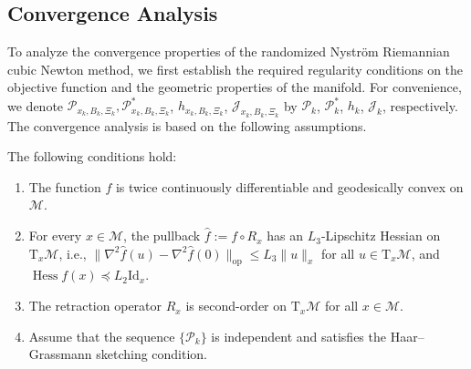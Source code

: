 \documentclass[final,onefignum,onetabnum]{siamart250211}
\newcommand{\Hess}{\operatorname{Hess}}
\newif\ifarxivversion
\begin{document}
  \ifarxivversion


\subsection{Convergence Analysis}
\label{sec:convergence-analysis}
To analyze the convergence properties of the randomized Nystr\"om Riemannian cubic Newton method, we first establish the required regularity conditions on the objective function and the geometric properties of the manifold.
For convenience, we denote $\mathcal{P}_{x_k, B_k, \Xi_k}, \mathcal{P}_{x_k, B_k, \Xi_k}^*$, $h_{x_k, B_k, \Xi_k}$, $\mathcal{J}_{x_k, B_k, \Xi_k}$ by $\mathcal{P}_k$, $\mathcal{P}_k^*$, $h_k$, $\mathcal{J}_k$, respectively.
The convergence analysis is based on the following assumptions.
\begin{assumption}
\label{ass:smooth}
The following conditions hold:
\begin{enumerate}
\item[1.] The function $f$ is twice continuously differentiable and geodesically convex on $\mathcal{M}$.

\item[2.] For every $x\in\mathcal{M}$, the pullback $\hat f:=f\circ R_x$ has an $L_3$-Lipschitz Hessian on $\mathrm{T}_x\mathcal{M}$, i.e., $\|\nabla^{2}\hat f(u)-\nabla^{2}\hat f(0)\|_{\mathrm{op}}\le L_3\|u\|_x$ for all $u\in\mathrm{T}_x\mathcal{M}$, and $\Hess f(x) \preceq L_2 \mathrm{Id}_x$.

\item[3.] The retraction operator $R_x$ is second-order on $\mathrm{T}_x\mathcal{M}$ for all $x\in\mathcal{M}$. 

\item[4.] Assume that the sequence $\{\mathcal{P}_k\}$ is independent and satisfies the Haar--Grassmann sketching condition.
\end{enumerate}
\end{assumption} 
\end{document}
